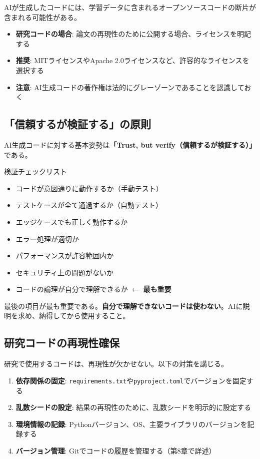 AIが生成したコードには、学習データに含まれるオープンソースコードの断片が含まれる可能性がある。

\begin{itemize}
\item \textbf{研究コードの場合}: 論文の再現性のために公開する場合、ライセンスを明記する
\item \textbf{推奨}: MITライセンスやApache 2.0ライセンスなど、許容的なライセンスを選択する
\item \textbf{注意}: AI生成コードの著作権は法的にグレーゾーンであることを認識しておく
\end{itemize}

\subsection{「信頼するが検証する」の原則}

AI生成コードに対する基本姿勢は\textbf{「Trust, but verify（信頼するが検証する）」}である。

\begin{itembox}[l]{検証チェックリスト}
\begin{itemize}
\item コードが意図通りに動作するか（手動テスト）
\item テストケースが全て通過するか（自動テスト）
\item エッジケースでも正しく動作するか
\item エラー処理が適切か
\item パフォーマンスが許容範囲内か
\item セキュリティ上の問題がないか
\item コードの論理が自分で理解できるか $\leftarrow$ \textbf{最も重要}
\end{itemize}
\end{itembox}

最後の項目が最も重要である。\textbf{自分で理解できないコードは使わない}。AIに説明を求め、納得してから使用すること。

\subsection{研究コードの再現性確保}

研究で使用するコードは、再現性が欠かせない。以下の対策を講じる。

\begin{enumerate}
\item \textbf{依存関係の固定}: \texttt{requirements.txt}や\texttt{pyproject.toml}でバージョンを固定する
\item \textbf{乱数シードの設定}: 結果の再現性のために、乱数シードを明示的に設定する
\item \textbf{環境情報の記録}: Pythonバージョン、OS、主要ライブラリのバージョンを記録する
\item \textbf{バージョン管理}: Gitでコードの履歴を管理する（第8章で詳述）
\end{enumerate}

